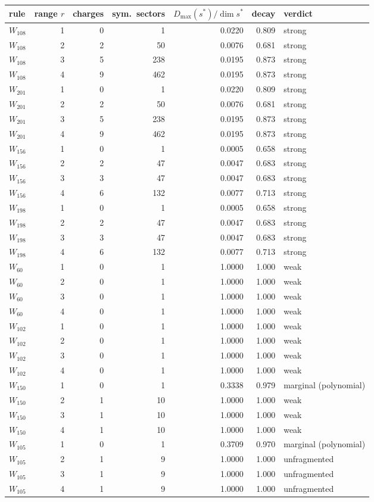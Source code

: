 \begin{tabular}{lrrrrrl}
\toprule
rule & range $r$ & charges & sym.\ sectors & $D_{\max}(s^*)/\dim s^*$ & decay & verdict \\
\midrule
$W_{108}$ & 1 & 0 & 1 & 0.0220 & 0.809 & strong \\
$W_{108}$ & 2 & 2 & 50 & 0.0076 & 0.681 & strong \\
$W_{108}$ & 3 & 5 & 238 & 0.0195 & 0.873 & strong \\
$W_{108}$ & 4 & 9 & 462 & 0.0195 & 0.873 & strong \\
$W_{201}$ & 1 & 0 & 1 & 0.0220 & 0.809 & strong \\
$W_{201}$ & 2 & 2 & 50 & 0.0076 & 0.681 & strong \\
$W_{201}$ & 3 & 5 & 238 & 0.0195 & 0.873 & strong \\
$W_{201}$ & 4 & 9 & 462 & 0.0195 & 0.873 & strong \\
$W_{156}$ & 1 & 0 & 1 & 0.0005 & 0.658 & strong \\
$W_{156}$ & 2 & 2 & 47 & 0.0047 & 0.683 & strong \\
$W_{156}$ & 3 & 3 & 47 & 0.0047 & 0.683 & strong \\
$W_{156}$ & 4 & 6 & 132 & 0.0077 & 0.713 & strong \\
$W_{198}$ & 1 & 0 & 1 & 0.0005 & 0.658 & strong \\
$W_{198}$ & 2 & 2 & 47 & 0.0047 & 0.683 & strong \\
$W_{198}$ & 3 & 3 & 47 & 0.0047 & 0.683 & strong \\
$W_{198}$ & 4 & 6 & 132 & 0.0077 & 0.713 & strong \\
$W_{60}$ & 1 & 0 & 1 & 1.0000 & 1.000 & weak \\
$W_{60}$ & 2 & 0 & 1 & 1.0000 & 1.000 & weak \\
$W_{60}$ & 3 & 0 & 1 & 1.0000 & 1.000 & weak \\
$W_{60}$ & 4 & 0 & 1 & 1.0000 & 1.000 & weak \\
$W_{102}$ & 1 & 0 & 1 & 1.0000 & 1.000 & weak \\
$W_{102}$ & 2 & 0 & 1 & 1.0000 & 1.000 & weak \\
$W_{102}$ & 3 & 0 & 1 & 1.0000 & 1.000 & weak \\
$W_{102}$ & 4 & 0 & 1 & 1.0000 & 1.000 & weak \\
$W_{150}$ & 1 & 0 & 1 & 0.3338 & 0.979 & marginal (polynomial) \\
$W_{150}$ & 2 & 1 & 10 & 1.0000 & 1.000 & weak \\
$W_{150}$ & 3 & 1 & 10 & 1.0000 & 1.000 & weak \\
$W_{150}$ & 4 & 1 & 10 & 1.0000 & 1.000 & weak \\
$W_{105}$ & 1 & 0 & 1 & 0.3709 & 0.970 & marginal (polynomial) \\
$W_{105}$ & 2 & 1 & 9 & 1.0000 & 1.000 & unfragmented \\
$W_{105}$ & 3 & 1 & 9 & 1.0000 & 1.000 & unfragmented \\
$W_{105}$ & 4 & 1 & 9 & 1.0000 & 1.000 & unfragmented \\
\bottomrule
\end{tabular}
